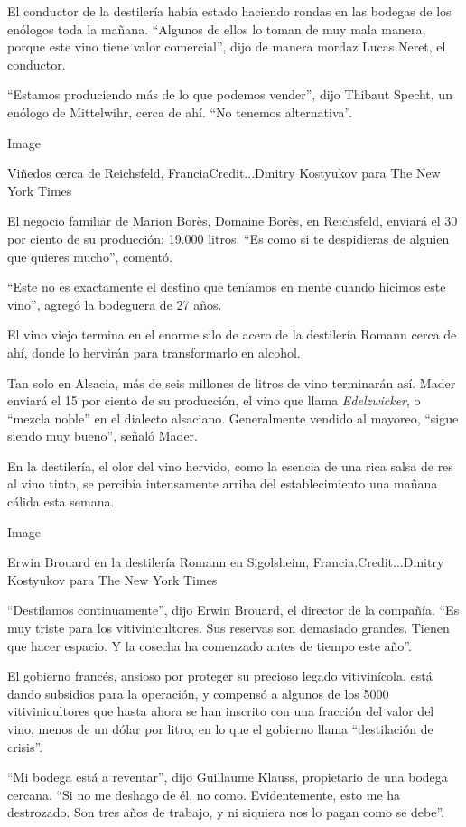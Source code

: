 El conductor de la destilería había estado haciendo rondas en las
bodegas de los enólogos toda la mañana. ``Algunos de ellos lo toman de
muy mala manera, porque este vino tiene valor comercial'', dijo de
manera mordaz Lucas Neret, el conductor.

``Estamos produciendo más de lo que podemos vender'', dijo Thibaut
Specht, un enólogo de Mittelwihr, cerca de ahí. ``No tenemos
alternativa''.

Image

Viñedos cerca de Reichsfeld, FranciaCredit...Dmitry Kostyukov para The
New York Times

El negocio familiar de Marion Borès, Domaine Borès, en Reichsfeld,
enviará el 30 por ciento de su producción: 19.000 litros. ``Es como si
te despidieras de alguien que quieres mucho'', comentó.

``Este no es exactamente el destino que teníamos en mente cuando hicimos
este vino'', agregó la bodeguera de 27 años.

El vino viejo termina en el enorme silo de acero de la destilería Romann
cerca de ahí, donde lo hervirán para transformarlo en alcohol.

Tan solo en Alsacia, más de seis millones de litros de vino terminarán
así. Mader enviará el 15 por ciento de su producción, el vino que llama
\emph{Edelzwicker}, o ``mezcla noble'' en el dialecto alsaciano.
Generalmente vendido al mayoreo, ``sigue siendo muy bueno'', señaló
Mader.

En la destilería, el olor del vino hervido, como la esencia de una rica
salsa de res al vino tinto, se percibía intensamente arriba del
establecimiento una mañana cálida esta semana.

Image

Erwin Brouard en la destilería Romann en Sigolsheim,
Francia.Credit...Dmitry Kostyukov para The New York Times

``Destilamos continuamente'', dijo Erwin Brouard, el director de la
compañía. ``Es muy triste para los vitivinicultores. Sus reservas son
demasiado grandes. Tienen que hacer espacio. Y la cosecha ha comenzado
antes de tiempo este año''.

El gobierno francés, ansioso por proteger su precioso legado
vitivinícola, está dando subsidios para la operación, y compensó a
algunos de los 5000 vitivinicultores que hasta ahora se han inscrito con
una fracción del valor del vino, menos de un dólar por litro, en lo que
el gobierno llama ``destilación de crisis''.

``Mi bodega está a reventar'', dijo Guillaume Klauss, propietario de una
bodega cercana. ``Si no me deshago de él, no como. Evidentemente, esto
me ha destrozado. Son tres años de trabajo, y ni siquiera nos lo pagan
como se debe''.

